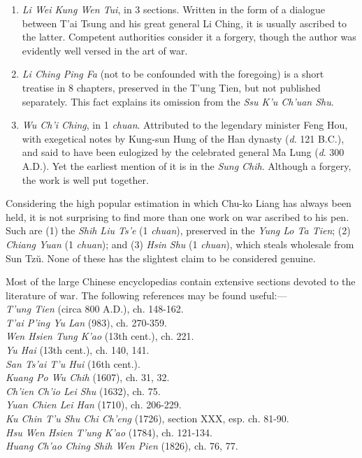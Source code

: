 \documentclass[10pt,a4paper]{book}
\begin{document}
\begin{enumerate}[label=\arabic*., leftmargin=*, labelsep=1em, itemsep=1em, align=left, nosep, wide=0pt]
    \item \textit{Li Wei Kung Wen Tui}, in 3 sections. Written in the form of a dialogue between T’ai Tsung and his great general Li Ching, it is usually ascribed to the latter. Competent authorities consider it a forgery, though the author was evidently well versed in the art of war.
    \item \textit{Li Ching Ping Fa} (not to be confounded with the foregoing) is a short treatise in 8 chapters, preserved in the T’ung Tien, but not published separately. This fact explains its omission from the \textit{Ssu K’u Ch’uan Shu}.
    \item \textit{Wu Ch’i Ching}, in 1 \textit{chuan}. Attributed to the legendary minister Feng Hou, with exegetical notes by Kung-sun Hung of the Han dynasty (\textit{d}. 121 B.C.), and said to have been eulogized by the celebrated general Ma Lung (\textit{d}. 300 A.D.). Yet the earliest mention of it is in the \textit{Sung Chih}. Although a forgery, the work is well put together.
\end{enumerate}

Considering the high popular estimation in which Chu-ko Liang has always been held, it is not surprising to find more than one work on war ascribed to his pen. Such are (1) the \textit{Shih Liu Ts’e} (1 \textit{chuan}), preserved in the \textit{Yung Lo Ta Tien}; (2) \textit{Chiang Yuan} (1 \textit{chuan}); and (3) \textit{Hsin Shu} (1 \textit{chuan}), which steals wholesale from Sun Tzŭ. None of these has the slightest claim to be considered genuine.

Most of the large Chinese encyclopedias contain extensive sections devoted to the literature of war. The following references may be found useful:---\\
\textit{T’ung Tien} (circa 800 A.D.), ch. 148-162. \\
\textit{T’ai P’ing Yu Lan} (983), ch. 270-359. \\
\textit{Wen Hsien Tung K’ao} (13th cent.), ch. 221. \\
\textit{Yu Hai} (13th cent.), ch. 140, 141. \\
\textit{San Ts’ai T’u Hui} (16th cent.). \\
\textit{Kuang Po Wu Chih} (1607), ch. 31, 32. \\
\textit{Ch’ien Ch’io Lei Shu} (1632), ch. 75. \\
\textit{Yuan Chien Lei Han} (1710), ch. 206-229. \\
\textit{Ku Chin T’u Shu Chi Ch’eng} (1726), section XXX, esp. ch. 81-90. \\
\textit{Hsu Wen Hsien T’ung K’ao} (1784), ch. 121-134. \\
\textit{Huang Ch’ao Ching Shih Wen Pien} (1826), ch. 76, 77.
\end{document}

